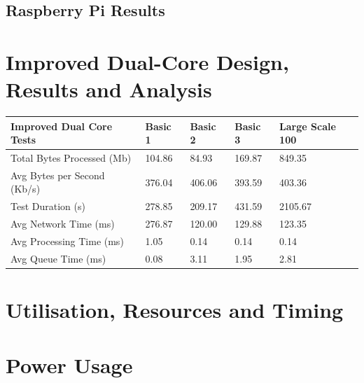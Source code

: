 \newpage
\subsection{Raspberry Pi Results}

\section{Improved Dual-Core Design, Results and Analysis}
\begin{table}[!ht]
    \centering
    \begin{tabular}{|l|l|l|l|l|}
    \hline
        Improved Dual Core Tests & Basic 1 & Basic 2 & Basic 3 & Large Scale 100 \\ \hline
        Total Bytes Processed (Mb) & 104.86 & 84.93 & 169.87 & 849.35 \\ \hline
        Avg Bytes per Second (Kb/s) & 376.04 & 406.06 & 393.59 & 403.36 \\ \hline
        Test Duration (s) & 278.85 & 209.17 & 431.59 & 2105.67 \\ \hline
        Avg Network Time (ms) & 276.87 & 120.00 & 129.88 & 123.35 \\ \hline
        Avg Processing Time (ms) & 1.05 & 0.14 & 0.14 & 0.14 \\ \hline
        Avg Queue Time (ms) & 0.08 & 3.11 & 1.95 & 2.81 \\ \hline
    \end{tabular}
\end{table}
\section{Utilisation, Resources and Timing}
\section{Power Usage}